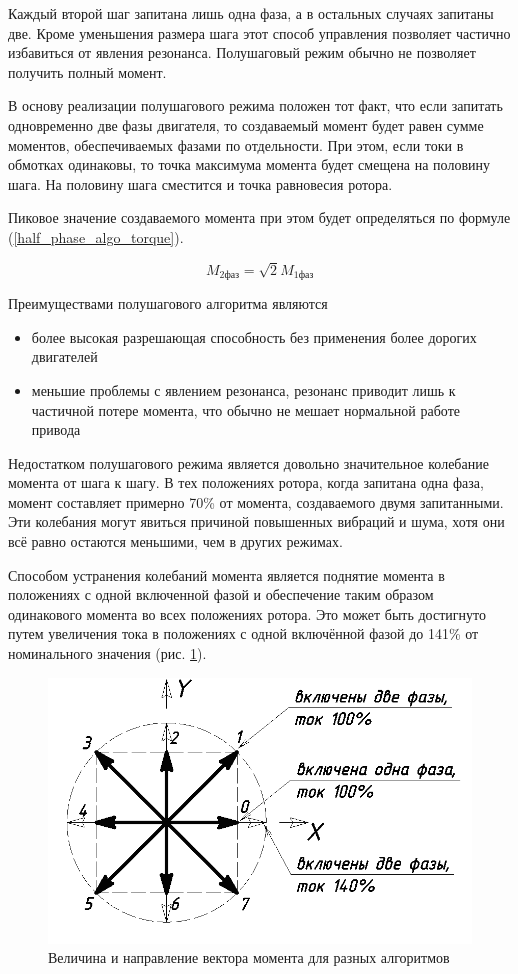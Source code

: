 Каждый второй шаг запитана лишь одна фаза, а в остальных случаях запитаны две.
Кроме уменьшения размера шага этот способ управления позволяет частично избавиться
от явления резонанса. Полушаговый режим обычно не позволяет получить полный момент.

В основу реализации полушагового режима положен тот факт, что если запитать
одновременно две фазы двигателя, то создаваемый момент будет равен
сумме моментов, обеспечиваемых фазами по отдельности. При этом, если токи в
обмотках одинаковы, то точка максимума момента будет смещена на половину шага.
На половину шага сместится и точка равновесия ротора.

Пиковое значение создаваемого момента при этом будет определяться по формуле
(\ref{half_phase_algo_torque}).

\begin{equation}
    M_\textit{2фаз} = \sqrt{2} M_\textit{1фаз}
    \label{half_phase_algo_torque}
\end{equation}

Преимуществами полушагового алгоритма являются
\begin{itemize}
    \item более высокая разрешающая способность без применения более дорогих
        двигателей
    \item меньшие проблемы с явлением резонанса, резонанс приводит лишь к частичной
        потере момента, что обычно не мешает нормальной работе привода
\end{itemize}

Недостатком полушагового режима является довольно значительное колебание момента от
шага к шагу. В тех положениях ротора, когда запитана одна фаза, момент составляет
примерно 70\% от момента, создаваемого двумя запитанными. Эти колебания могут
явиться причиной повышенных вибраций и шума, хотя они всё равно остаются меньшими,
чем в других режимах.

Способом устранения колебаний момента является поднятие момента в
положениях с одной включенной фазой и обеспечение таким образом одинакового момента
во всех положениях ротора. Это может быть достигнуто путем увеличения тока в
положениях с одной включённой фазой до 141\% от номинального значения
(рис. \ref{pic_torque_diagram}).

\begin{figure}
    \centering
    \includegraphics[width=0.6\linewidth, keepaspectratio]
                    {./src/pictures/control_algo/torque_diag}
    \caption{Величина и направление вектора момента для разных алгоритмов}
    \label{pic_torque_diagram}
\end{figure}

